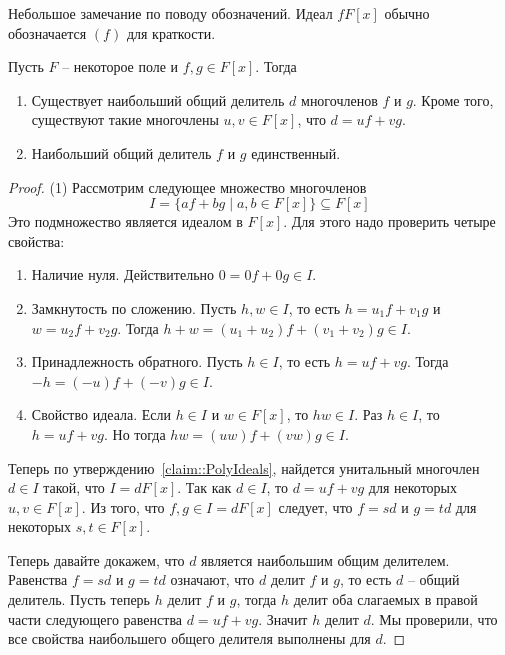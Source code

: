 Небольшое замечание по поводу обозначений.
Идеал $fF[x]$ обычно обозначается $(f)$ для краткости.

\begin{claim}
\label{claim::PolyGCD}
Пусть $F$ -- некоторое поле и $f,g\in F[x]$.
Тогда
\begin{enumerate}
\item Существует наибольший общий делитель $d$ многочленов $f$ и $g$.
Кроме того, существуют такие многочлены $u,v\in F[x]$, что $d = uf + v g$.

\item Наибольший общий делитель $f$ и $g$ единственный.
\end{enumerate}
\end{claim}
\begin{proof}
(1) Рассмотрим следующее множество многочленов
\[
I = \{a f + b g \mid a, b \in F[x]\}\subseteq F[x]
\]
Это подмножество является идеалом в $F[x]$.
Для этого надо проверить четыре свойства:
\begin{enumerate}
\item Наличие нуля.
Действительно $0 = 0 f + 0 g \in I$.

\item Замкнутость по сложению.
Пусть $h, w\in I$, то есть $h = u_1 f + v_1 g$ и $w = u_2 f + v_2 g$.
Тогда $h + w = (u_1 + u_2) f + (v_1 + v_2) g\in I$.

\item Принадлежность обратного.
Пусть $h \in I$, то есть $h = u f + v g$.
Тогда $-h = (-u) f + (-v) g\in I$.

\item Свойство идеала.
Если $h\in I$ и $w \in F[x]$, то $hw \in I$.
Раз $h\in I$, то $h = uf + vg$.
Но тогда $hw = (uw) f + (vw) g\in I$.
\end{enumerate}


Теперь по утверждению~\ref{claim::PolyIdeals}, найдется унитальный многочлен $d\in I$ такой, что $I = d F[x]$.
Так как $d\in I$, то $d = uf + vg$ для некоторых $u, v\in F[x]$.
Из того, что $f, g \in I = d F[x]$ следует, что $f = s d$ и $g = t d$ для некоторых $s, t \in F[x]$.

Теперь давайте докажем, что $d$ является наибольшим общим делителем.
Равенства $f = s d$ и $g = t d$ означают, что $d$ делит $f$ и $g$, то есть $d$ -- общий делитель.
Пусть теперь $h$ делит $f$ и $g$, тогда $h$ делит оба слагаемых в правой части следующего равенства $d = uf + vg$.
Значит $h$ делит $d$.
Мы проверили, что все свойства наибольшего общего делителя выполнены для $d$.


\end{proof}
